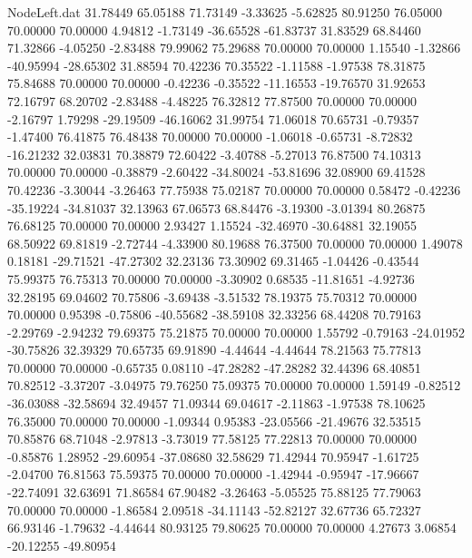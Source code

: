 \begin{filecontents}{NodeLeft.dat}
  31.78449   65.05188   71.73149    -3.33625   -5.62825   80.91250   76.05000   70.00000   70.00000    4.94812   -1.73149  -36.65528  -61.83737
  31.83529   68.84460   71.32866    -4.05250   -2.83488   79.99062   75.29688   70.00000   70.00000    1.15540   -1.32866  -40.95994  -28.65302
  31.88594   70.42236   70.35522    -1.11588   -1.97538   78.31875   75.84688   70.00000   70.00000   -0.42236   -0.35522  -11.16553  -19.76570
  31.92653   72.16797   68.20702    -2.83488   -4.48225   76.32812   77.87500   70.00000   70.00000   -2.16797    1.79298  -29.19509  -46.16062
  31.99754   71.06018   70.65731    -0.79357   -1.47400   76.41875   76.48438   70.00000   70.00000   -1.06018   -0.65731   -8.72832  -16.21232
  32.03831   70.38879   72.60422    -3.40788   -5.27013   76.87500   74.10313   70.00000   70.00000   -0.38879   -2.60422  -34.80024  -53.81696
  32.08900   69.41528   70.42236    -3.30044   -3.26463   77.75938   75.02187   70.00000   70.00000    0.58472   -0.42236  -35.19224  -34.81037
  32.13963   67.06573   68.84476    -3.19300   -3.01394   80.26875   76.68125   70.00000   70.00000    2.93427    1.15524  -32.46970  -30.64881
  32.19055   68.50922   69.81819    -2.72744   -4.33900   80.19688   76.37500   70.00000   70.00000    1.49078    0.18181  -29.71521  -47.27302
  32.23136   73.30902   69.31465    -1.04426   -0.43544   75.99375   76.75313   70.00000   70.00000   -3.30902    0.68535  -11.81651   -4.92736
  32.28195   69.04602   70.75806    -3.69438   -3.51532   78.19375   75.70312   70.00000   70.00000    0.95398   -0.75806  -40.55682  -38.59108
  32.33256   68.44208   70.79163    -2.29769   -2.94232   79.69375   75.21875   70.00000   70.00000    1.55792   -0.79163  -24.01952  -30.75826
  32.39329   70.65735   69.91890    -4.44644   -4.44644   78.21563   75.77813   70.00000   70.00000   -0.65735    0.08110  -47.28282  -47.28282
  32.44396   68.40851   70.82512    -3.37207   -3.04975   79.76250   75.09375   70.00000   70.00000    1.59149   -0.82512  -36.03088  -32.58694
  32.49457   71.09344   69.04617    -2.11863   -1.97538   78.10625   76.35000   70.00000   70.00000   -1.09344    0.95383  -23.05566  -21.49676
  32.53515   70.85876   68.71048    -2.97813   -3.73019   77.58125   77.22813   70.00000   70.00000   -0.85876    1.28952  -29.60954  -37.08680
  32.58629   71.42944   70.95947    -1.61725   -2.04700   76.81563   75.59375   70.00000   70.00000   -1.42944   -0.95947  -17.96667  -22.74091
  32.63691   71.86584   67.90482    -3.26463   -5.05525   75.88125   77.79063   70.00000   70.00000   -1.86584    2.09518  -34.11143  -52.82127
  32.67736   65.72327   66.93146    -1.79632   -4.44644   80.93125   79.80625   70.00000   70.00000    4.27673    3.06854  -20.12255  -49.80954

\end{filecontents}
